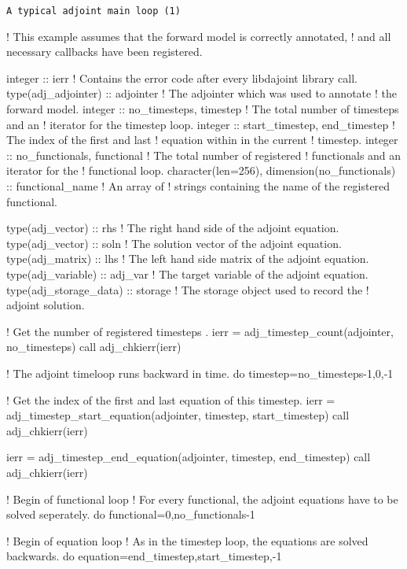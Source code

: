 \begin{boxwithtitle}{\texttt{A typical adjoint main loop (1)}}
\begin{minipage}{\columnwidth}
\begin{fortrancode}   
  ! This example assumes that the forward model is correctly annotated,
  ! and all necessary callbacks have been registered. 

  integer :: ierr ! Contains the error code after every libdajoint library call.
  type(adj_adjointer)  :: adjointer ! The adjointer which was used to annotate 
                                    ! the forward model.
  integer :: no_timesteps, timestep ! The total number of timesteps and an 
                                    ! iterator for the timestep loop.
  integer :: start_timestep, end_timestep ! The index of the first and last 
                                          ! equation within in the current 
                                          ! timestep. 
  integer :: no_functionals, functional ! The total number of registered 
                                        ! functionals and an iterator for the 
                                        ! functional loop.
  character(len=256), dimension(no_functionals) :: functional_name ! An array of 
                    ! strings containing the name of the registered functional.

  type(adj_vector) :: rhs ! The right hand side of the adjoint equation.
  type(adj_vector) :: soln ! The solution vector of the adjoint equation.
  type(adj_matrix) :: lhs ! The left hand side matrix of the adjoint equation.
  type(adj_variable) :: adj_var ! The target variable of the adjoint equation.
  type(adj_storage_data) :: storage ! The storage object used to record the 
                                    ! adjoint solution.

  ! Get the number of registered timesteps .
  ierr = adj_timestep_count(adjointer, no_timesteps)
  call adj_chkierr(ierr)

  ! The adjoint timeloop runs backward in time.
  do timestep=no_timesteps-1,0,-1

    ! Get the index of the first and last equation of this timestep.
    ierr = adj_timestep_start_equation(adjointer, timestep, start_timestep)
    call adj_chkierr(ierr)

    ierr = adj_timestep_end_equation(adjointer, timestep, end_timestep)
    call adj_chkierr(ierr)

    ! Begin of functional loop
    ! For every functional, the adjoint equations have to be solved seperately.
    do functional=0,no_functionals-1

      ! Begin of equation loop
      ! As in the timestep loop, the equations are solved backwards.
      do equation=end_timestep,start_timestep,-1
      
\end{fortrancode}
\end{minipage}
\end{boxwithtitle}

